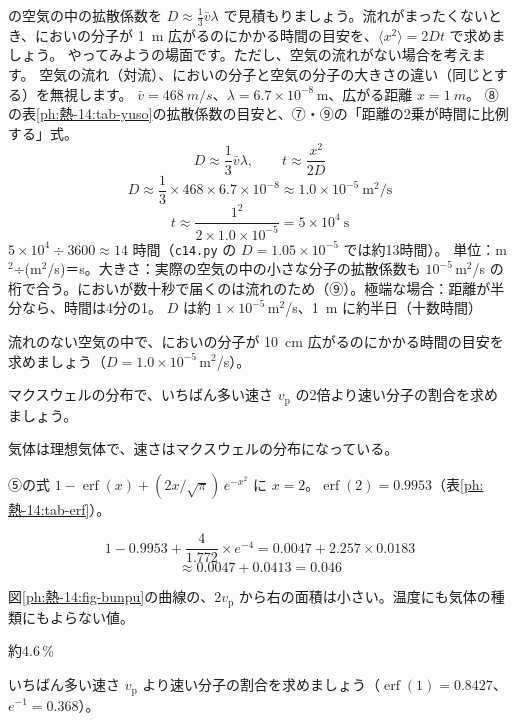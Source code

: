 \begin{phreidai}[においの分子が広がる時間]
\label{ph:熱-14:ex10}の空気の中の拡散係数を $D\approx\tfrac13\bar v\lambda$ で見積もりましょう。流れがまったくないとき、においの分子が \qty{1}{m} 広がるのにかかる時間の目安を、$\langle x^2\rangle=2Dt$ で求めましょう。
\phbamen
やってみようの場面です。ただし、空気の流れがない場合を考えます。
\phmushi
空気の流れ（対流）、においの分子と空気の分子の大きさの違い（同じとする）を無視します。
\phzu
$\bar v=\qty{468}{m/s}$、$\lambda=6.7\times10^{-8}$\,m、広がる距離 $x=\qty{1}{m}$。
\phriyu
⑧の表\ref{ph:熱-14:tab-yuso}の拡散係数の目安と、⑦・⑨の「距離の2乗が時間に比例する」式。
\phtateru
\[ D\approx\frac{1}{3}\bar v\lambda,\qquad t\approx\frac{x^2}{2D} \]
\phtoku
\[ D\approx\frac{1}{3}\times468\times6.7\times10^{-8}\approx1.0\times10^{-5}\ \mathrm{m^2/s} \]
\[ t\approx\frac{1^2}{2\times1.0\times10^{-5}}=5\times10^4\ \mathrm{s} \]
$5\times10^4\div3600\approx14$ 時間（\texttt{c14.py} の $D=1.05\times10^{-5}$ では約13時間）。
\phtashikame
単位：m$^2$÷(m$^2$/s)＝s。大きさ：実際の空気の中の小さな分子の拡散係数も $10^{-5}$\,m$^2$/s の桁で合う。においが数十秒で届くのは流れのため（⑨）。極端な場合：距離が半分なら、時間は4分の1。
\kotae $D$ は約 $1\times10^{-5}$\,m$^2$/s、\qty{1}{m} に約半日（十数時間）
\end{phreidai}
\begin{jibun}
流れのない空気の中で、においの分子が \qty{10}{cm} 広がるのにかかる時間の目安を求めましょう（$D=1.0\times10^{-5}$\,m$^2$/s）。
\end{jibun}

\begin{reidai}[速い分子の割合]
\label{ph:熱-14:ex11}マクスウェルの分布で、いちばん多い速さ $v_{\mathrm p}$ の2倍より速い分子の割合を求めましょう。
\par{} 気体は理想気体で、速さはマクスウェルの分布になっている。
\par\kangaekata ⑤の式 $1-\operatorname{erf}(x)+(2x/\sqrt\pi)\,e^{-x^2}$ に $x=2$。$\operatorname{erf}(2)=0.9953$（表\ref{ph:熱-14:tab-erf}）。
\par\shiki
\[ 1-0.9953+\frac{4}{1.772}\times e^{-4}=0.0047+2.257\times0.0183 \]
\[ \approx0.0047+0.0413=0.046 \]
\par{} 図\ref{ph:熱-14:fig-bunpu}の曲線の、$2v_{\mathrm p}$ から右の面積は小さい。温度にも気体の種類にもよらない値。
\par\kotae 約4.6\,\%
\end{reidai}
\begin{jibun}
いちばん多い速さ $v_{\mathrm p}$ より速い分子の割合を求めましょう（$\operatorname{erf}(1)=0.8427$、$e^{-1}=0.368$）。
\end{jibun}

